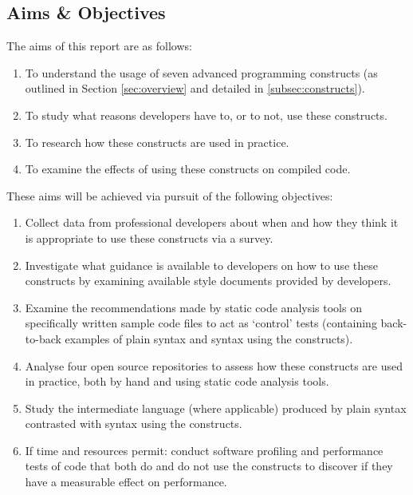 \documentclass{article}
\begin{document}
    \subsection{Aims \& Objectives}
    \label{subsec:aimsAndObjs}
        The aims of this report are as follows:
        \begin{enumerate}
            \item To understand the usage of seven advanced programming constructs (as outlined in Section \ref{sec:overview} and detailed in \ref{subsec:constructs}).
            \item To study what reasons developers have to, or to not, use these constructs.
            \item To research how these constructs are used in practice.
            \item To examine the effects of using these constructs on compiled code.
        \end{enumerate}
        \hspace*{1cm}\newline

        These aims will be achieved via pursuit of the following objectives:
        \begin{enumerate}
            \item Collect data from professional developers about when and how they think it is appropriate to use these constructs via a survey.
            \item Investigate what guidance is available to developers on how to use these constructs by examining available style documents provided by developers.
            \item Examine the recommendations made by static code analysis tools on specifically written sample code files to act as `control' tests (containing back-to-back examples of plain syntax and syntax using the constructs).
            \item Analyse four open source repositories to assess how these constructs are used in practice, both by hand and using static code analysis tools.
            \item Study the intermediate language (where applicable) produced by plain syntax contrasted with syntax using the constructs.
            \item If time and resources permit: conduct software profiling and performance tests of code that both do and do not use the constructs to discover if they have a measurable effect on performance.
        \end{enumerate}
\end{document}
